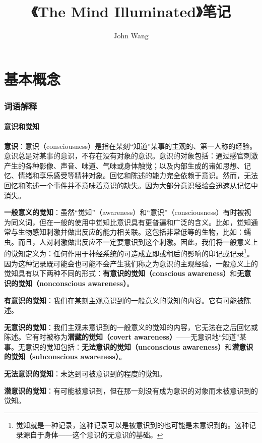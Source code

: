 \documentclass{ctexart}
\def\dfn#1{\textbf{#1}}
\def\dfnb#1#2{\textbf{#1（#2）}}
\begin{document}
    \title{《The Mind Illuminated》笔记}
    \author{John Wang}
    \date{}
    \maketitle
    \tableofcontents

\part{基本概念}
    \section{词语解释}

    \subsection{意识和觉知}

    \dfn{意识}：意识（consciousness）是指在某刻“知道”某事的主观的、第一人称的经验。意识总是对某事的意识，不存在没有对象的意识。意识的对象包括：通过感官刺激产生的各种影像、声音、味道、气味或身体触觉；以及内部生成的诸如思想、记忆、情绪和享乐感受等精神对象。回忆和陈述的能力完全依赖于意识。然而，无法回忆和陈述一个事件并不意味着意识的缺失。因为大部分意识经验会迅速从记忆中消失。

    \dfn{一般意义的觉知}：虽然“觉知”（awareness）和“意识”（consciousness）有时被视为同义词，但在一般的使用中觉知比意识具有更普遍和广泛的含义。比如，觉知通常与生物感知刺激并做出反应的能力相关联。这包括非常低等的生物，比如：蠕虫。而且，人对刺激做出反应不一定要意识到这个刺激。因此，我们将一般意义上的觉知定义为：任何作用于神经系统的可造成立即或稍后的影响的印记或记录\footnote{觉知就是一种记录，这种记录可以是被意识到的也可能是未意识到的。这种记录源自于身体——这个意识的无意识的基础。}。因为这种记录既可能会也可能不会产生我们称之为意识的主观经验，一般意义上的觉知具有以下两种不同的形式：\dfnb{有意识的觉知}{conscious awareness}和\dfnb{无意识的觉知}{nonconscious awareness}。

    \dfn{有意识的觉知}：我们在某刻主观意识到的一般意义的觉知的内容。它有可能被陈述。

    \dfn{无意识的觉知}：我们主观未意识到的一般意义的觉知的内容，它无法在之后回忆或陈述。它有时被称为\dfnb{潜藏的觉知}{covert awareness}——无意识地“知道”某事。无意识的觉知包括：\dfnb{无法意识的觉知}{unconscious awareness}和\dfnb{潜意识的觉知}{subconscious awareness}。

    \dfn{无法意识的觉知}：未达到可被意识到的程度的觉知。

    \dfn{潜意识的觉知}：有可能被意识到，但在那一刻没有成为意识的对象而未被意识到的觉知。
\end{document}
